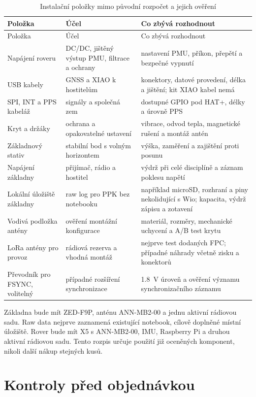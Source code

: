 \small
\begin{longtable}{@{}L{0.27\textwidth}L{0.33\textwidth}L{0.32\textwidth}@{}}
  \caption{Instalační položky mimo původní rozpočet a jejich ověření}\label{tab:bom-b}\\
  \toprule
  Položka & Účel & Co zbývá rozhodnout \\
  \midrule
  \endfirsthead
  \toprule
  Položka & Účel & Co zbývá rozhodnout \\
  \midrule
  \endhead
  Napájení roveru & DC/DC, jištěný výstup PMU, filtrace a ochrany & nastavení PMU, příkon, přepětí a bezpečné vypnutí \\
  USB kabely & GNSS a XIAO k hostitelům & konektory, datové provedení, délka a jištění; kit XIAO kabel nemá \\
  SPI, INT a PPS kabeláž & signály a společná zem & dostupné GPIO pod HAT+, délky a úrovně PPS \\
  Kryt a držáky & ochrana a opakovatelné ustavení & vibrace, odvod tepla, magnetické rušení a montáž antén \\
  Základnový stativ & stabilní bod s volným horizontem & výška, zaměření a zajištění proti posunu \\
  Napájení základny & přijímač, rádio a hostitel & výdrž při celé disciplíně a záznam poklesu napětí \\
  Lokální úložiště základny & raw log pro PPK bez notebooku & například microSD, rozhraní a piny nekolidující s Wio; kapacita, výdrž zápisu a zotavení \\
  Vodivá podložka antény & ověření montážní konfigurace & materiál, rozměry, mechanické uchycení a A/B test krytu \\
  LoRa antény pro provoz & rádiová rezerva a vhodná montáž & nejprve test dodaných FPC; případné náhrady včetně zisku a konektorů \\
  Převodník pro FSYNC, volitelný & případné rozšíření synchronizace & \SI{1.8}{V} úroveň a ověření významu synchronizačního záznamu \\
  \bottomrule
\end{longtable}
\normalsize

Základna bude mít ZED-F9P, anténu ANN-MB2-00 a jednu aktivní
rádiovou sadu. Raw data nejprve zaznamená existující notebook, cílově
doplněné místní úložiště. Rover bude mít X5 s ANN-MB2-00,
IMU, Raspberry Pi a druhou aktivní rádiovou sadu. Tento rozpis určuje použití
již oceněných komponent, nikoli další nákup stejných kusů.

\section{Kontroly před objednávkou}

